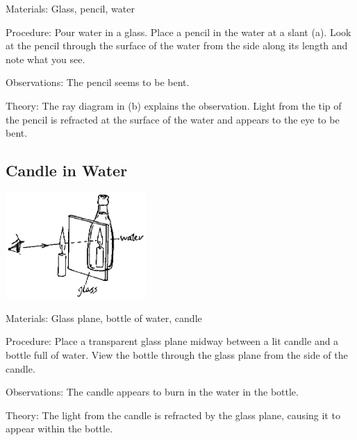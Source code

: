\begin{multicols}{2}
\begin{description*}
\item[Materials:]{Glass, pencil, water}
\item[Procedure:]{Pour water in a glass. Place a pencil in the water at a slant (a). Look at the pencil through the surface of the water from the side along its length and note what you see.}
\item[Observations:]{The pencil seems to be bent.}
\item[Theory:]{The ray diagram in (b) explains the observation. Light from the tip of the pencil is refracted at the surface of the water and appears to the eye to be bent.}
\end{description*}

\subsection{Candle in Water}

\begin{center}
\includegraphics[width=0.4\textwidth]{./img/source/candle-in-water.png}
\end{center}

\begin{description*}
\item[Materials:]{Glass plane, bottle of water, candle}
\item[Procedure:]{Place a transparent glass plane midway between a lit candle and a bottle full of water. View the bottle through the glass plane from the side of the candle.}
\item[Observations:]{The candle appears to burn in the water in the bottle.}
\item[Theory:]{The light from the candle is refracted by the glass plane, causing it to appear within the bottle.}
\end{description*}


\end{multicols}
